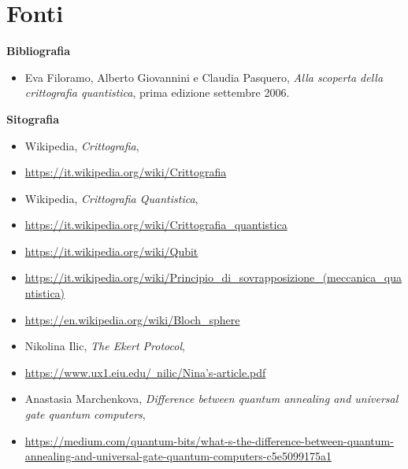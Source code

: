 \documentclass[a4paper, 12pt]{article}
\begin{document}
\clearpage

\section{Fonti}

{\large \textbf{Bibliografia}\par}
\begin{itemize}
    \item Eva Filoramo, Alberto Giovannini e Claudia Pasquero, \textit{Alla scoperta della crittografia quantistica}, prima edizione settembre 2006.
\end{itemize}

{\large \textbf{Sitografia}\par}
\begin{itemize}
    \item Wikipedia, \textit{Crittografia}, 
    \item[] \href{https://it.wikipedia.org/wiki/Crittografia}{https://it.wikipedia.org/wiki/Crittografia}
    \item Wikipedia, \textit{Crittografia Quantistica},
    \item[] \href{https://it.wikipedia.org/wiki/Crittografia\_quantistica}{https://it.wikipedia.org/wiki/Crittografia\_quantistica}
    \item[] \href{https://it.wikipedia.org/wiki/Qubit}{https://it.wikipedia.org/wiki/Qubit}
    \item[] \href{https://it.wikipedia.org/wiki/Principio\_di\_sovrapposizione\_(meccanica\_quantistica)}{https://it.wikipedia.org/wiki/Principio\_di\_sovrapposizione\_(meccanica\_quantistica)}
    \item[] \href{https://en.wikipedia.org/wiki/Bloch\_sphere}{https://en.wikipedia.org/wiki/Bloch\_sphere}
    \item Nikolina  Ilic, \textit{The Ekert Protocol},
    \item[] \href{https://www.ux1.eiu.edu/~nilic/Nina's-article.pdf}{https://www.ux1.eiu.edu/~nilic/Nina's-article.pdf}
    \item Anastasia Marchenkova, \textit{Difference between quantum annealing and universal gate quantum computers},
    \item[] \href{https://medium.com/quantum-bits/what-s-the-difference-between-quantum-annealing-and-universal-gate-quantum-computers-c5e5099175a1}{https://medium.com/quantum-bits/what-s-the-difference-between-quantum-annealing-and-universal-gate-quantum-computers-c5e5099175a1}
\end{itemize}
\end{document}
